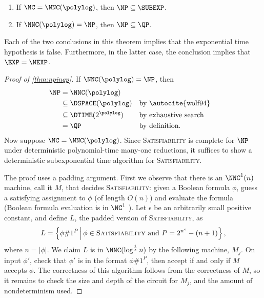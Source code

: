 \documentclass{article}
\begin{document}
\begin{theorem}\label{thm:npinqp}
  \mbox{}
  \begin{enumerate}
  \item If $\NC = \NNC(\polylog)$, then $\NP \subseteq \SUBEXP$.
  \item If $\NNC(\polylog) = \NP$, then $\NP \subseteq \QP$.
  \end{enumerate}
\end{theorem}
Each of the two conclusions in this theorem implies that the exponential time hypothesis is false.
Furthermore, in the latter case, the conclusion implies that $\EXP = \NEXP$.
\begin{proof}[Proof of \autoref{thm:npinqp}]
  If $\NNC(\polylog) = \NP$, then
  \begin{align*}
    \NP & = \NNC(\polylog) \\
        & \subseteq \DSPACE(\polylog) && \text{by \autocite{wolf94}} \\
        & \subseteq \DTIME(2^{\polylog}) && \text{by exhaustive search} \\
        & = \QP && \text{by definition}.
  \end{align*}
  Now suppose $\NC = \NNC(\polylog)$.
  Since \textsc{Satisfiability} is complete for $\NP$ under deterministic polynomial-time many-one reductions, it suffices to show a deterministic subexponential time algorithm for \textsc{Satisfiability}.

  The proof uses a padding argument.
  First we observe that there is an $\NNC^1(n)$ machine, call it $M$, that decides \textsc{Satisfiability}: given a Boolean formula $\phi$, guess a satisfying assignment to $\phi$ (of length $O(n)$) and evaluate the formula (Boolean formula evaluation is in $\NC^1$ \autocite{buss87}).
  Let $\epsilon$ be an arbitrarily small positive constant, and define $L$, the padded version of \textsc{Satisfiability}, as
  \begin{equation*}
    L = \left\{ \phi \# 1^P \, \middle| \, \phi \in \textsc{Satisfiability} \text{ and } P = 2^{n^\epsilon} - (n + 1) \right\},
  \end{equation*}
  where $n = |\phi|$.
  We claim $L$ is in $\NNC(\log^\frac{1}{\epsilon} n)$ by the following machine, $M_j$.
  On input $\phi'$, check that $\phi'$ is in the format $\phi \# 1^P$, then accept if and only if $M$ accepts $\phi$.
  The correctness of this algorithm follows from the correctness of $M$, so it remains to check the size and depth of the circuit for $M_j$, and the amount of nondeterminism used.


\end{proof}
\end{document}
